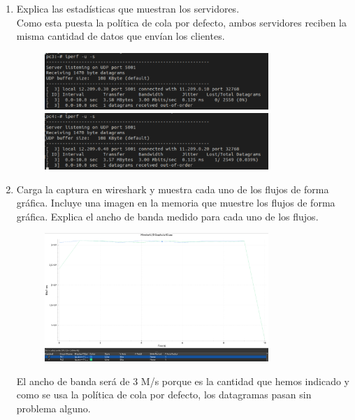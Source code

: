 \documentclass[12pt, a4paper]{report}
\begin{document}
\begin{enumerate}
	\item Explica las estadísticas que muestran los servidores.\\
	
	Como esta puesta la política de cola por defecto, ambos servidores reciben la misma cantidad de datos que envían los clientes.
	\begin{figure}[h]
		\centering
		\includegraphics[width=0.8\textwidth]{ej1.1.2_1_a}\\
		\includegraphics[width=0.8\textwidth]{ej1.1.2_1_b}\\
	\end{figure}
	\item Carga la captura en wireshark y muestra cada uno de los flujos de forma gráfica. Incluye una
	imagen en la memoria que muestre los flujos de forma gráfica. Explica el ancho de banda medido
	para cada uno de los flujos.\\
	\begin{figure}[H]
		\centering
		\includegraphics[width=0.8\textwidth]{ej1.1.2_2}
	\end{figure}
	El ancho de banda será de 3 M/s porque es la cantidad que hemos indicado y como se usa la política de cola por defecto, los datagramas pasan sin problema alguno.
\end{enumerate}
\end{document}
